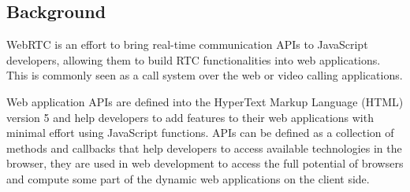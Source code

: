 %
%
%

\subsection{Background}

WebRTC is an effort to bring real-time communication APIs to JavaScript developers, allowing them to build RTC functionalities into web applications. This is commonly seen as a call system over the web or video calling applications. 

Web application APIs are defined into the HyperText Markup Language (HTML)  version 5 and help developers to add features to their web applications with minimal effort using JavaScript functions. APIs can be defined as a collection of methods and callbacks that help developers to access available technologies in the browser, they are used in web development to access the full potential of browsers and compute some part of the dynamic web applications on the client side.

